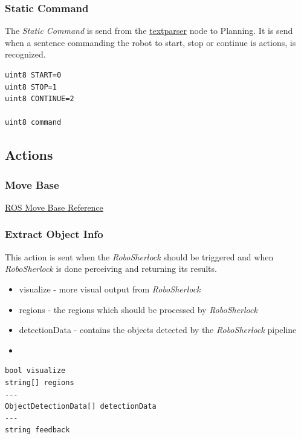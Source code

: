 \documentclass[main.tex]{subfiles}
\begin{document}
				\subsubsection{Static Command}
				\label{msg_static_command}
				The \textit{Static Command} is send from the \hyperref[textparser]{textparser} node to Planning. It is send when a sentence commanding the robot to start, stop or continue is actions, is recognized.
					\begin{lstlisting}
uint8 START=0
uint8 STOP=1
uint8 CONTINUE=2
		
uint8 command
\end{lstlisting}
				\subsection{Actions}
				\label{actions}
					\subsubsection{Move Base}
					\label{msg_move_base}
						\href{http://wiki.ros.org/move_base_msgs/MoveBaseAction}{ROS Move Base Reference}
					\subsubsection{Extract Object Info}
					\label{msg_extract_object_info}
						This action is sent when the \textit{RoboSherlock} should be triggered and when \textit{RoboSherlock} is done perceiving and returning its results.
					\begin{itemize}
						\item visualize - more visual output from \textit{RoboSherlock}
						\item regions - the regions which should be processed by \textit{RoboSherlock}
						\item detectionData - contains the objects detected by the \textit{RoboSherlock} pipeline
						\item
					\end{itemize}
					\begin{lstlisting}
bool visualize
string[] regions
---
ObjectDetectionData[] detectionData
---
string feedback
\end{lstlisting}
\end{document}
